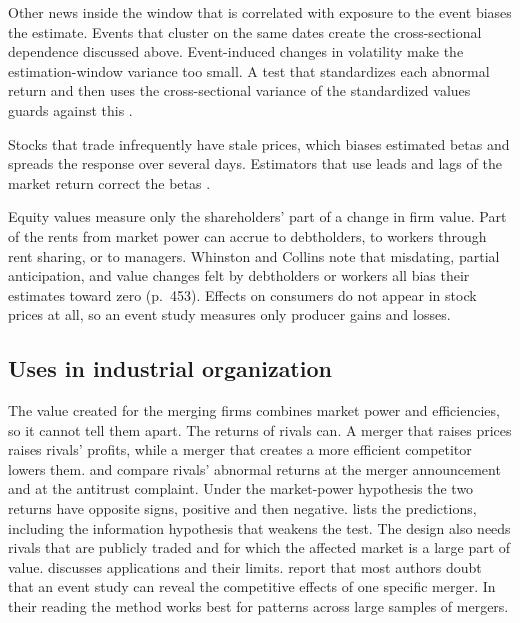 Other news inside the window that is correlated with exposure to the event biases the estimate. Events that cluster
on the same dates create the cross-sectional dependence discussed above. Event-induced changes in volatility make the
estimation-window variance too small. A test that standardizes each abnormal return and then uses the cross-sectional
variance of the standardized values guards against this \citep{BoehmerMusumeciPoulsen1991}.

Stocks that trade infrequently have stale prices, which biases estimated betas and spreads the response over
several days. Estimators that use leads and lags of the market return correct the betas \citep{ScholesWilliams1977}.

Equity values measure only the shareholders' part of a change in firm value. Part of the rents from market power can
accrue to debtholders, to workers through rent sharing, or to managers. Whinston and Collins note that misdating,
partial anticipation, and value changes felt by debtholders or workers all bias their estimates toward zero
(p.~453). Effects on consumers do not appear in stock prices at all, so an event study measures only producer gains
and losses.

\subsection{Uses in industrial organization}\label{sec:A-es-io}

The value created for the merging firms combines market power and efficiencies, so it cannot tell them apart. The
returns of rivals can. A merger that raises prices raises rivals' profits, while a merger that creates a more
efficient competitor lowers them. \citet{Eckbo1983} and \citet{Stillman1983} compare rivals' abnormal returns at the
merger announcement and at the antitrust complaint. Under the market-power hypothesis the two returns have opposite
signs, positive and then negative.  lists the predictions, including the information
hypothesis that weakens the test. The design also needs rivals that are publicly traded and for which the affected
market is a large part of value.  discusses applications and their limits.
\citet[p.~231, n.~137]{AskerNocke2021} report that most authors doubt that an event study can reveal the competitive
effects of one specific merger. In their reading the method works best for patterns across large samples of mergers.

